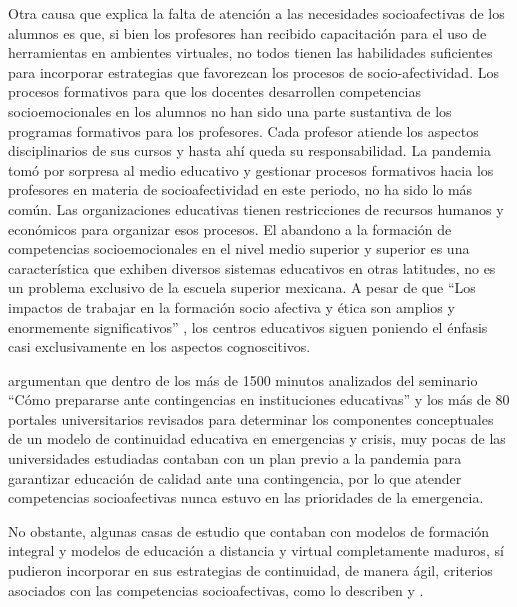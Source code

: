 \documentclass{textolivre}
\begin{document}
Otra causa que explica la falta de atención a las necesidades socioafectivas de los alumnos es que, si bien los profesores han recibido capacitación para el uso de herramientas en ambientes virtuales, no todos tienen las habilidades suficientes para incorporar estrategias que favorezcan los procesos de socio-afectividad. Los procesos formativos para que los docentes desarrollen competencias socioemocionales en los alumnos no han sido una parte sustantiva de los programas formativos para los profesores. Cada profesor atiende los aspectos disciplinarios de sus cursos y hasta ahí queda su responsabilidad. La pandemia tomó por sorpresa al medio educativo y gestionar procesos formativos hacia los profesores en materia de socioafectividad en este periodo, no ha sido lo más común.  Las organizaciones educativas tienen restricciones de recursos humanos y económicos para organizar esos procesos. 
El abandono a la formación de competencias socioemocionales en el nivel medio superior y superior es una característica que exhiben diversos sistemas educativos en otras latitudes, no es un problema exclusivo de la escuela superior mexicana. A pesar de que “Los impactos de trabajar en la formación socio afectiva y ética son amplios y enormemente significativos” \cite[p. 19]{romagnoli2007}, los centros educativos siguen poniendo el énfasis casi exclusivamente en los aspectos cognoscitivos. 

\textcite{escuderohanon-ramirez2021} argumentan que dentro de los más de 1500 minutos analizados del seminario “Cómo prepararse ante contingencias en instituciones educativas” y los más de 80 portales universitarios revisados para determinar los componentes conceptuales de un modelo de continuidad educativa en emergencias y crisis, muy pocas de las universidades estudiadas contaban con un plan previo a la pandemia para garantizar educación de calidad ante una contingencia, por lo que atender competencias socioafectivas nunca estuvo en las prioridades de la emergencia.

No obstante, algunas casas de estudio que contaban con modelos de formación integral y modelos de educación a distancia y virtual completamente maduros, sí pudieron incorporar en sus estrategias de continuidad, de manera ágil, criterios asociados con las competencias socioafectivas, como lo describen \textcite{guerra2020} y \textcite{deurquijo2020}.
\end{document}

